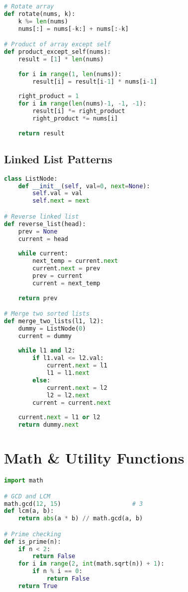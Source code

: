 \documentclass[9pt,a4paper]{article}
\begin{document}
\begin{multicols}{2}
\begin{lstlisting}[language=Python]
# Rotate array
def rotate(nums, k):
    k %= len(nums)
    nums[:] = nums[-k:] + nums[:-k]

# Product of array except self
def product_except_self(nums):
    result = [1] * len(nums)
    
    for i in range(1, len(nums)):
        result[i] = result[i-1] * nums[i-1]
    
    right_product = 1
    for i in range(len(nums)-1, -1, -1):
        result[i] *= right_product
        right_product *= nums[i]
    
    return result
\end{lstlisting}

\subsection*{Linked List Patterns}
\begin{lstlisting}[language=Python]
class ListNode:
    def __init__(self, val=0, next=None):
        self.val = val
        self.next = next

# Reverse linked list
def reverse_list(head):
    prev = None
    current = head
    
    while current:
        next_temp = current.next
        current.next = prev
        prev = current
        current = next_temp
    
    return prev

# Merge two sorted lists
def merge_two_lists(l1, l2):
    dummy = ListNode(0)
    current = dummy
    
    while l1 and l2:
        if l1.val <= l2.val:
            current.next = l1
            l1 = l1.next
        else:
            current.next = l2
            l2 = l2.next
        current = current.next
    
    current.next = l1 or l2
    return dummy.next
\end{lstlisting}

\section*{Math \& Utility Functions}
\begin{lstlisting}[language=Python]
import math

# GCD and LCM
math.gcd(12, 15)                    # 3
def lcm(a, b):
    return abs(a * b) // math.gcd(a, b)

# Prime checking
def is_prime(n):
    if n < 2:
        return False
    for i in range(2, int(math.sqrt(n)) + 1):
        if n % i == 0:
            return False
    return True


\end{lstlisting}
\end{multicols}
\end{document}
